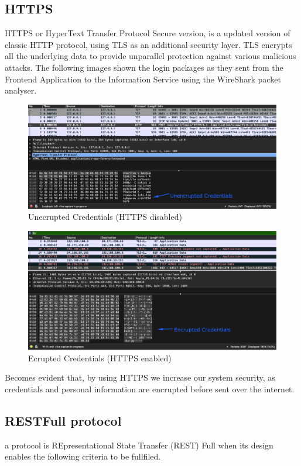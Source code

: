 		\subsection{HTTPS}
			HTTPS or HyperText Transfer Protocol Secure version, is a updated version of classic HTTP protocol, using TLS as an additional security layer. TLS 
			encrypts all the underlying data to provide unparallel protection against various malicious attacks. The following images shown the login packages as
			they sent from the Frontend Application to the Information Service using the WireShark packet analyser.
			\begin{figure}[H]
				\iftrue
				\caption{Unecrupted Credentials (HTTPS disabled)}
				\centering
				\includegraphics[scale=0.3]{figures/http}
				\fi
			\end{figure}
			\begin{figure}[H]
				\iftrue
				\caption{Ecrupted Credentials (HTTPS enabled)}
				\centering
				\includegraphics[scale=0.3]{figures/https}
				\fi
			\end{figure}
			Becomes evident that, by using HTTPS we increase our system security, as credentials and personal information are encrupted before sent over the
			internet.
		\subsection{RESTFull protocol}
			a protocol is REpresentational State Transfer (REST) \cite{pautasso_zimmermann_leymann_2008}Full when its design enables the following criteria to be fullfiled.
